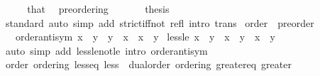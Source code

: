 \begin{isabellebody}
%
\isadelimproof
%
\endisadelimproof
%
\isatagproof
{}\isamarkupfalse%
\ {\isacharminus}{\kern0pt}\isanewline
\ \ \isamarkupfalse%
\ that\ \isamarkupfalse%
\ preordering\ {\isacartoucheopen}{\isacharparenleft}{\kern0pt}\isactrlbold {\isasymle}{\isacharparenright}{\kern0pt}{\isacartoucheclose}\ {\isacartoucheopen}{\isacharparenleft}{\kern0pt}\isactrlbold {\isacharless}{\kern0pt}{\isacharparenright}{\kern0pt}{\isacartoucheclose}\ \isacommand{{\isachardot}{\kern0pt}}\isamarkupfalse%
\isanewline
\ \ \isamarkupfalse%
\ {\isacharquery}{\kern0pt}thesis\isanewline
\ \ \ \ \isamarkupfalse%
\ standard\ {\isacharparenleft}{\kern0pt}auto\ simp\ add{\isacharcolon}{\kern0pt}\ strict{\isacharunderscore}{\kern0pt}iff{\isacharunderscore}{\kern0pt}not\ refl\ intro{\isacharcolon}{\kern0pt}\ trans{\isacharparenright}{\kern0pt}\isanewline
{}\isamarkupfalse%
%
\endisatagproof
{\isafoldproof}%
%
\isadelimproof
%
\endisadelimproof
%
\isadelimdocument
%
\endisadelimdocument
%
\isatagdocument
%
\isamarkuptrue%
%
\endisatagdocument
{\isafolddocument}%
%
\isadelimdocument
%
\endisadelimdocument
{}\isamarkupfalse%
\ order\ {\isacharequal}{\kern0pt}\ preorder\ {\isacharplus}{\kern0pt}\isanewline
\ \ \ order{\isacharunderscore}{\kern0pt}antisym{\isacharcolon}{\kern0pt}\ {\isachardoublequoteopen}x\ {\isasymle}\ y\ {\isasymLongrightarrow}\ y\ {\isasymle}\ x\ {\isasymLongrightarrow}\ x\ {\isacharequal}{\kern0pt}\ y{\isachardoublequoteclose}\isanewline
{}\isanewline
\isanewline
{}\isamarkupfalse%
\ less{\isacharunderscore}{\kern0pt}le{\isacharcolon}{\kern0pt}\ {\isachardoublequoteopen}x\ {\isacharless}{\kern0pt}\ y\ {\isasymlongleftrightarrow}\ x\ {\isasymle}\ y\ {\isasymand}\ x\ {\isasymnoteq}\ y{\isachardoublequoteclose}\isanewline
%
\isadelimproof
\ \ %
\endisadelimproof
%
\isatagproof
{}\isamarkupfalse%
\ {\isacharparenleft}{\kern0pt}auto\ simp\ add{\isacharcolon}{\kern0pt}\ less{\isacharunderscore}{\kern0pt}le{\isacharunderscore}{\kern0pt}not{\isacharunderscore}{\kern0pt}le\ intro{\isacharcolon}{\kern0pt}\ order{\isacharunderscore}{\kern0pt}antisym{\isacharparenright}{\kern0pt}%
\endisatagproof
{\isafoldproof}%
%
\isadelimproof
\isanewline
%
\endisadelimproof
\isanewline
{}\isamarkupfalse%
\ order{\isacharcolon}{\kern0pt}\ ordering\ less{\isacharunderscore}{\kern0pt}eq\ less\ {\isacharplus}{\kern0pt}\ dual{\isacharunderscore}{\kern0pt}order{\isacharcolon}{\kern0pt}\ ordering\ greater{\isacharunderscore}{\kern0pt}eq\ greater\isanewline

\end{isabellebody}
